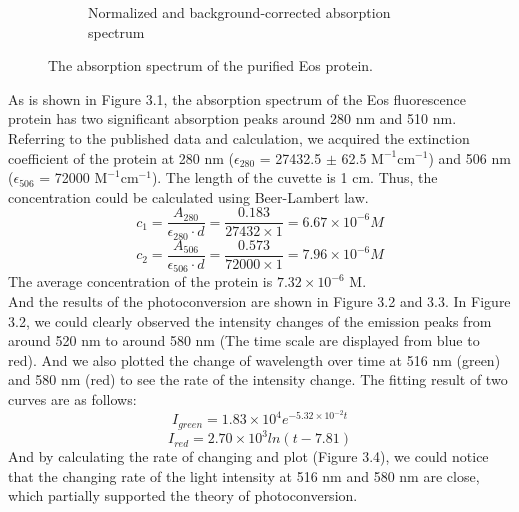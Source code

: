\documentclass[a4paper,english,12pt,bibliography=totoc]{scrreprt}
\begin{document}
\begin{figure}[htbp]
\begin{subfigure}[b]{0.45\textwidth}
        \caption{Normalized and background-corrected absorption spectrum}
        \label{fig:sub2}
    \end{subfigure}
    \caption{The absorption spectrum of the purified Eos protein. }
    \label{fig:main}
\end{figure}
As is shown in Figure 3.1, the absorption spectrum of the Eos fluorescence protein has two significant absorption peaks around 280 nm and 510 nm. Referring to the published data\cite{D1CB00014D} and calculation, we acquired the extinction coefficient of the protein at 280 nm ($\epsilon_{280}$ = 27432.5 $\pm$ 62.5 $\mathrm{M^{-1}cm^{-1}}$) and 506 nm ($\epsilon_{506}$ = 72000 $\mathrm{M^{-1}cm^{-1}}$). The length of the cuvette is 1 cm. Thus, the concentration could be calculated using Beer-Lambert law.
\[
c_1 = \frac{A_{280}}{\epsilon_{280} \cdot d} = \frac{0.183}{27432 \times 1} = 6.67 \times 10^{-6} M
\]
\[
c_2 = \frac{A_{506}}{\epsilon_{506} \cdot d} = \frac{0.573}{72000 \times 1} = 7.96 \times 10^{-6} M
\]
The average concentration of the protein is $7.32 \times 10^{-6}$ M.\\
And the results of the photoconversion are shown in Figure 3.2 and 3.3. In Figure 3.2, we could clearly observed the intensity changes of the emission peaks from around 520 nm to around 580 nm (The time scale are displayed from blue to red). And we also plotted the change of wavelength over time at 516 nm (green) and 580 nm (red) to see the rate of the intensity change. The fitting result of two curves are as follows:
\[
I_{green} = 1.83 \times 10^{4} e^{-5.32\times 10^{-2} t}
\]
\[
I_{red} = 2.70 \times 10^{3} ln(t-7.81)
\]
And by calculating the rate of changing and plot (Figure 3.4), we could notice that the changing rate of the light intensity at 516 nm and 580 nm are close, which partially supported the theory of photoconversion.
\end{document}
